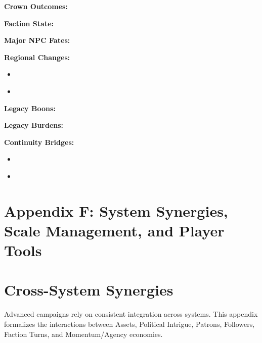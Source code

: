 \documentclass[11pt]{article}
\begin{document}
\begin{tcolorbox}[
  title=\textbf{Legacy Snapshot (Quick Reference)},
  colback=gray!10,
  colframe=black,
  fonttitle=\bfseries,
  left=6pt,
  right=6pt,
  top=6pt,
  bottom=6pt,
  enhanced,
  sharp corners
,breakable]

\textbf{Crown Outcomes:} \underline{\phantom{XXXXXXXXXXXXXXXX}}

\textbf{Faction State:} \underline{\phantom{XXXXXXXX}}

\textbf{Major NPC Fates:} \underline{\phantom{XXXXXXXX}}

\textbf{Regional Changes:}
\begin{itemize}[leftmargin=1.2em]
  \item \underline{\phantom{Change}}
  \item \underline{\phantom{Change}}
\end{itemize}

\textbf{Legacy Boons:} \underline{\phantom{XXXXXXXX}}

\textbf{Legacy Burdens:} \underline{\phantom{XXXXXXXX}}

\textbf{Continuity Bridges:}
\begin{itemize}[leftmargin=1.2em]
  \item \underline{\phantom{Bridge}}
  \item \underline{\phantom{Bridge}}
\end{itemize}

\end{tcolorbox}

\appendix
\section*{Appendix F: System Synergies, Scale Management, and Player Tools}


\section{Cross-System Synergies}
\label{appendix:cross-system-synergies}

Advanced campaigns rely on consistent integration across systems. This appendix formalizes 
the interactions between Assets, Political Intrigue, Patrons, Followers, Faction Turns, and 
Momentum/Agency economies.
\end{document}
